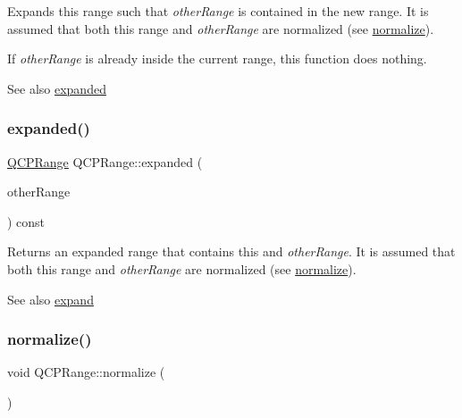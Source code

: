 Expands this range such that {\itshape other\+Range} is contained in the new range. It is assumed that both this range and {\itshape other\+Range} are normalized (see \mbox{\hyperlink{class_q_c_p_range_af914a7740269b0604d0827c634a878a9}{normalize}}).

If {\itshape other\+Range} is already inside the current range, this function does nothing.

\begin{DoxySeeAlso}{See also}
\mbox{\hyperlink{class_q_c_p_range_a9cbfb7cd06eac1839cae981e05c19633}{expanded}} 
\end{DoxySeeAlso}
\mbox{\label{class_q_c_p_range_a9cbfb7cd06eac1839cae981e05c19633}} 
\subsubsection{\texorpdfstring{expanded()}{expanded()}}
{\footnotesize\ttfamily \mbox{\hyperlink{class_q_c_p_range}{Q\+C\+P\+Range}} Q\+C\+P\+Range\+::expanded (\begin{DoxyParamCaption}\item[{const \mbox{\hyperlink{class_q_c_p_range}{Q\+C\+P\+Range}} \&}]{other\+Range }\end{DoxyParamCaption}) const}

Returns an expanded range that contains this and {\itshape other\+Range}. It is assumed that both this range and {\itshape other\+Range} are normalized (see \mbox{\hyperlink{class_q_c_p_range_af914a7740269b0604d0827c634a878a9}{normalize}}).

\begin{DoxySeeAlso}{See also}
\mbox{\hyperlink{class_q_c_p_range_a0fa1bc8048be50d52bea93a8caf08305}{expand}} 
\end{DoxySeeAlso}
\mbox{\label{class_q_c_p_range_af914a7740269b0604d0827c634a878a9}} 
\subsubsection{\texorpdfstring{normalize()}{normalize()}}
{\footnotesize\ttfamily void Q\+C\+P\+Range\+::normalize (\begin{DoxyParamCaption}{ }\end{DoxyParamCaption})}

